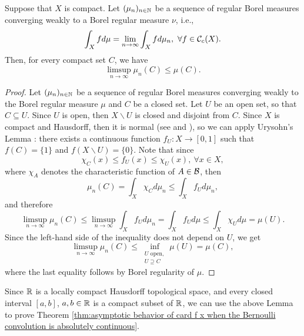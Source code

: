 \begin{lemma}\label{app:lem:sequence of weakly convergent measures can be upper bounded by the limit on compact sets}
    Suppose that $X$ is compact. Let $(\mu_n)_{n \in \mathbb{N}}$ be a sequence of regular Borel measures converging weakly to a Borel regular measure $\nu$, i.e.,
    \begin{equation}
        \int_Xfd\mu = \lim_{n \to \infty} \int_X fd\mu_n, \ \forall f \in \mathcal{C}_c(X).
    \end{equation}
    Then, for every compact set $C$, we have
    \begin{equation}
        \limsup_{n \to \infty} \mu_n(C) \leq \mu(C).
    \end{equation}
\end{lemma}
\begin{proof} 
    Let $(\mu_n)_{n \in \mathbb{N}}$ be a sequence of regular Borel measures converging weakly to the Borel regular measure $\mu$ and $C$ be a closed set. Let $U$ be an open set, so that $C \subseteq U$. Since $U$ is open, then $X \backslash U$ is closed and disjoint from $C$. Since $X$ is compact and Hausdorff, then it is normal (see \cite[p111]{lee2011IntroductionTopologicalManifolds} and \cite[Exercise 4.78]{lee2011IntroductionTopologicalManifolds}), so we can apply Urysohn's Lemma \cite[Lemma 4.82]{lee2011IntroductionTopologicalManifolds}: there exists a continuous function $f_U : X \to [0,1]$ such that $f(C) = \{1\}$ and $f(X\backslash U) = \{0\}$. Note that since 
    \begin{equation}
        \chi_C(x) \leq f_U(x) \leq \chi_U(x), \ \forall x \in X,
    \end{equation}
    where $\chi_A$ denotes the characteristic function of $A \in \mathcal{B}$, then
    \begin{equation}
        \mu_n(C) = \int_X \chi_C d\mu_n \leq \int_Xf_Ud\mu_n,
    \end{equation}
    and therefore
    \begin{equation}
        \limsup_{n \to \infty}\mu_n(C) \leq \limsup_{n \to \infty}\int_Xf_Ud\mu_n = \int_Xf_Ud\mu \leq \int_X\chi_U d\mu = \mu(U).
    \end{equation}
    Since the left-hand side of the inequality does not depend on $U$, we get
    \begin{equation}
        \limsup_{n \to \infty}\mu_n(C) \leq \inf_{\substack{U \text{ open},\\ U \supseteq C}} \mu(U) = \mu(C),
    \end{equation}
    where the last equality follows by Borel regularity of $\mu$.
\end{proof}

Since $\mathbb{R}$ is a locally compact Hausdorff topological space, and every closed interval $[a,b]$, $a,b \in \mathbb{R}$ is a compact subset of $\mathbb{R}$, we can use the above Lemma to prove Theorem \ref{thm:asymptotic behavior of card f x when the Bernoulli convolution is absolutely continuous}. 